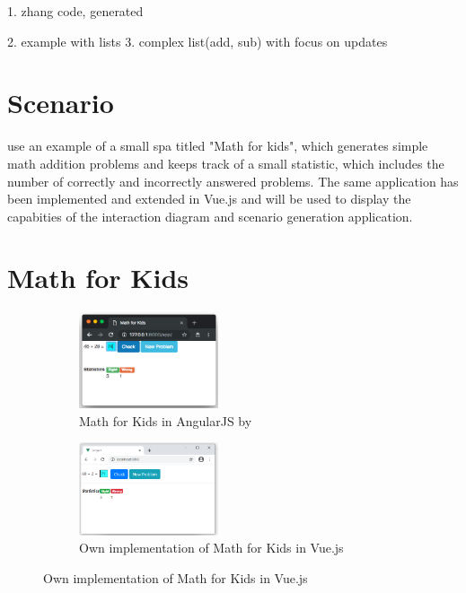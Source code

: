 1. zhang code, generated

2. example with lists
3. complex list(add, sub) with focus on updates

\section{Scenario}
\textcite{zhang2019scenario} use an example of a small \gls{spa} titled "Math for kids", which generates simple math addition problems and keeps track of a small statistic, which includes the number of correctly and incorrectly answered problems. The same application has been implemented and extended in Vue.js and will be used to display the capabities of the interaction diagram and scenario generation application.
\section{Math for Kids}

\begin{figure}[H]
    \centering
    \begin{subfigure}[b]{0.45\textwidth}
         \centering
         \includegraphics[width=0.45\textwidth]{images/math_for_kids_zhang.png}
         \caption{Math for Kids in AngularJS by \textcite{zhang2019scenario}}
         \label{fig:evaluation_math_kids_zhang}
    \end{subfigure}
    \begin{subfigure}[b]{0.45\textwidth}
        \centering
        \includegraphics[width=0.45\textwidth]{images/math_for_kids_own.png}
        \caption{Own implementation of Math for Kids in Vue.js}
        \label{fig:evaluation_math_kids_own}
    \end{subfigure}
\end{figure}


